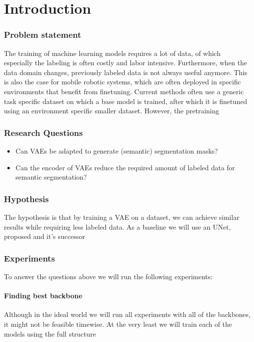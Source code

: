 \chapter{Introduction}\label{chapter:introduction}


\subsection*{Problem statement}
The training of machine learning models requires a lot of data, of which especially the labeling is often costly and labor intensive. Furthermore, when the data domain changes, previously labeled data is not always useful anymore. This is also the case for mobile robotic systems, which are often deployed in specific environments that benefit from finetuning. Current methods often use a generic task specific dataset on which a base model is trained, after which it is finetuned using an environment specific smaller dataset. However, the pretraining 



\subsection*{Research Questions}
\begin{itemize}
    \item Can VAEs be adapted to generate (semantic) segmentation masks?
    \item Can the encoder of VAEs reduce the required amount of labeled data for semantic segmentation?
\end{itemize}

\subsection*{Hypothesis}
The hypothesis is that by training a VAE on a dataset, we can achieve similar results while requiring less labeled data. As a baseline we will use an UNet, proposed \cite{ronneberger2015u} and it's successor \cite{zhou2018unet++}

\subsection*{Experiments}
To answer the questions above we will run the following experiments:

\subsubsection*{Finding best backbone}
Although in the ideal world we will run all experiments with all of the backbones, it might not be feasible timewise. At the very least we will train each of the models using the full structure











